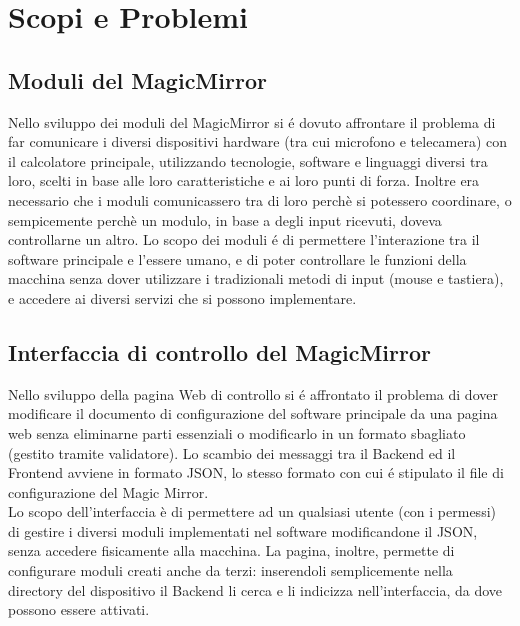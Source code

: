 \chapter{Scopi e Problemi}

\section{Moduli del MagicMirror}
Nello sviluppo dei moduli del MagicMirror si \'e dovuto affrontare il problema di far comunicare
i diversi dispositivi hardware (tra cui microfono e telecamera) con il calcolatore principale, utilizzando tecnologie,
software e linguaggi diversi tra loro, scelti in base alle loro caratteristiche e ai loro punti di forza.
Inoltre era necessario che i moduli comunicassero tra di loro perchè si potessero coordinare, o sempicemente
perchè un modulo, in base a degli input ricevuti, doveva controllarne un altro.
Lo scopo dei moduli \'e di permettere l'interazione tra il software principale
e l'essere umano, e di poter controllare le funzioni della macchina senza dover utilizzare
i tradizionali metodi di input (mouse e tastiera), e accedere ai diversi servizi che si possono implementare.
\\[2\baselineskip]
\section{Interfaccia di controllo del MagicMirror}
Nello sviluppo della pagina Web di controllo si \'e affrontato il problema di dover modificare
il documento di configurazione del software principale da una pagina web senza eliminarne parti essenziali
o modificarlo in un formato sbagliato (gestito tramite validatore).
Lo scambio dei messaggi tra il Backend ed il Frontend avviene in formato JSON, lo stesso formato
con cui \'e stipulato il file di configurazione del Magic Mirror.\\
Lo scopo dell'interfaccia è di permettere ad un qualsiasi utente (con i permessi) di gestire
i diversi moduli implementati nel software modificandone il JSON, senza accedere fisicamente alla macchina.
La pagina, inoltre, permette di configurare moduli creati anche da terzi: inserendoli
semplicemente nella directory del dispositivo il Backend li cerca e li indicizza nell'interfaccia,
da dove possono essere attivati.
